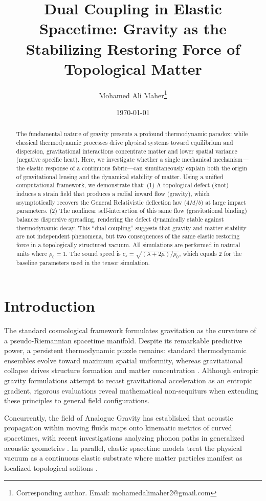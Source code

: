 \documentclass[11pt,a4paper]{article}
\title{\textbf{Dual Coupling in Elastic Spacetime: Gravity as the Stabilizing Restoring Force of Topological Matter}}
\author[1]{Mohamed Ali Maher\thanks{Corresponding author. Email: mohamedalimaher2@gmail.com}}
\affil[1]{Independent Researcher}
\date{\today}
\begin{document}
\maketitle

\begin{abstract}
The fundamental nature of gravity presents a profound thermodynamic paradox: while classical thermodynamic processes drive physical systems toward equilibrium and dispersion, gravitational interactions concentrate matter and lower spatial variance (negative specific heat). Here, we investigate whether a single mechanical mechanism—the elastic response of a continuous fabric—can simultaneously explain both the origin of gravitational lensing and the dynamical stability of matter. Using a unified computational framework, we demonstrate that: (1) A topological defect (knot) induces a strain field that produces a radial inward flow (gravity), which asymptotically recovers the General Relativistic deflection law (\(4M/b\)) at large impact parameters. (2) The nonlinear self-interaction of this same flow (gravitational binding) balances dispersive spreading, rendering the defect dynamically stable against thermodynamic decay. This ``dual coupling'' suggests that gravity and matter stability are not independent phenomena, but two consequences of the same elastic restoring force in a topologically structured vacuum. All simulations are performed in natural units where \(\rho_0 = 1\). The sound speed is \(c_s = \sqrt{(\lambda+2\mu)/\rho_0}\), which equals 2 for the baseline parameters used in the tensor simulation.
\end{abstract}

\section{Introduction}
The standard cosmological framework formulates gravitation as the curvature of a pseudo-Riemannian spacetime manifold. Despite its remarkable predictive power, a persistent thermodynamic puzzle remains: standard thermodynamic ensembles evolve toward maximum spatial uniformity, whereas gravitational collapse drives structure formation and matter concentration \cite{dai2017}. Although entropic gravity formulations attempt to recast gravitational acceleration as an entropic gradient, rigorous evaluations reveal mathematical non-sequiturs when extending these principles to general field configurations.

Concurrently, the field of Analogue Gravity \cite{unruh1981} has established that acoustic propagation within moving fluids maps onto kinematic metrics of curved spacetimes, with recent investigations analyzing phonon paths in generalized acoustic geometries \cite{visser1998}. In parallel, elastic spacetime models treat the physical vacuum as a continuous elastic substrate where matter particles manifest as localized topological solitons \cite{skyrme1961}. 
\end{document}
